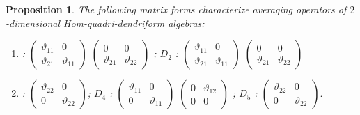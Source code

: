 \documentclass[11pt,twoside,reqno]{amsart}
\theoremstyle{plain}
\newtheorem{proposition}[thm]{Proposition}
\theoremstyle{definition}
\begin{document}
\begin{proposition}
The following matrix forms characterize  averaging operators of $2$-dimensional  Hom-quadri-dendriform algebras:
\begin{enumerate}
	\item[$D_1$] : 
$\left(\begin{array}{ccc}
\vartheta_{11}&0\\
\vartheta_{21}&\vartheta_{11}
\end{array}
\right)$
$\left(\begin{array}{ccc}
0&0\\
\vartheta_{21}&\vartheta_{22}
\end{array}
\right)$ ;
\quad
$D_2$ : 
$\left(\begin{array}{ccc}
\vartheta_{11}&0\\
\vartheta_{21}&\vartheta_{11}
\end{array}
\right)$ 
$\left(\begin{array}{ccc}
0&0\\
\vartheta_{21}&\vartheta_{22}
\end{array}
\right)$
\item[$D_3$] : 
$\left(\begin{array}{ccc}
\vartheta_{22}&0\\
0&\vartheta_{22}
\end{array}
\right)$;
\quad
$D_4$ : 
$\left(\begin{array}{ccc}
\vartheta_{11}&0\\
0&\vartheta_{11}
\end{array}
\right)$
$\left(\begin{array}{ccc}
0&\vartheta_{12}\\
0&0
\end{array}
\right)$
;
\quad
$D_5$ : 
$\left(\begin{array}{ccc}
\vartheta_{22}&0\\
0&\vartheta_{22}
\end{array}
\right).$
\end{enumerate}
\end{proposition}
\end{document}
